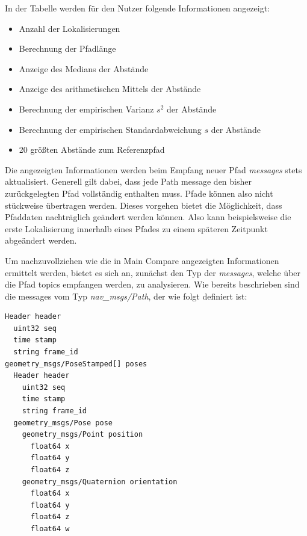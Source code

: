 In der Tabelle werden für den Nutzer folgende Informationen angezeigt:

\begin{itemize}
  \item Anzahl der Lokalisierungen
  \item Berechnung der Pfadlänge
  \item Anzeige des Medians der Abstände
  \item Anzeige des arithmetischen Mittels der Abstände
  \item Berechnung der empirischen Varianz $s^2$ der Abstände
  \item Berechnung der empirischen Standardabweichung $s$ der Abstände
  \item 20 größten Abstände zum Referenzpfad
\end{itemize}

Die angezeigten Informationen werden beim Empfang neuer Pfad \textit{messages} stets
aktualisiert. Generell gilt dabei, dass jede Path message den bisher
zurückgelegten Pfad vollständig
enthalten muss. Pfade können also nicht stückweise übertragen werden. Dieses vorgehen
bietet die Möglichkeit, dass Pfaddaten nachträglich geändert werden können.
Also kann beispielsweise die erste Lokalisierung innerhalb eines Pfades zu einem
späteren Zeitpunkt abgeändert werden. 

Um nachzuvollziehen wie die in Main Compare angezeigten Informationen ermittelt werden, bietet
es sich an, zunächst den Typ der \textit{messages}, welche über die Pfad topics
empfangen werden, zu analysieren. 
Wie bereits beschrieben sind die messages vom Typ
\textit{nav\_msgs/Path}, der wie folgt definiert ist:

\begin{lstlisting}[caption=ROS Path message, label=lst:pathmsgs]
Header header
  uint32 seq
  time stamp
  string frame_id
geometry_msgs/PoseStamped[] poses
  Header header
    uint32 seq
    time stamp
    string frame_id
  geometry_msgs/Pose pose
    geometry_msgs/Point position
      float64 x
      float64 y
      float64 z
    geometry_msgs/Quaternion orientation
      float64 x
      float64 y
      float64 z
      float64 w
\end{lstlisting}

